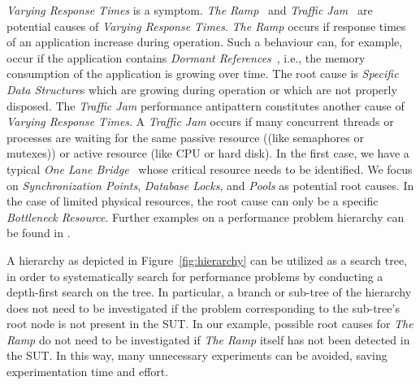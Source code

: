\documentclass{report}
\begin{document}
\emph{Varying Response Times} is a symptom. \emph{The Ramp}~\cite{smith2003new} and \emph{Traffic
Jam}~\cite{smith2002software} are potential causes of \emph{Varying Response
Times}.
\emph{The Ramp} occurs if response times of an application increase during
operation. Such a behaviour can, for example, occur if the
application contains \emph{Dormant References}~\cite{rayside2007object}, i.e.,
the memory consumption of the application is growing over time. The root cause
is \emph{Specific Data Structure}s which are growing during operation or which are not properly
disposed.
The \emph{Traffic Jam} performance antipattern constitutes another cause of \emph{Varying Response Times}. 
A \emph{Traffic Jam} occurs if many concurrent threads or processes are waiting for the same passive resource ((like
semaphores or mutexes)) or active resource (like
CPU or hard disk). In the first case, we have a typical \emph{One Lane Bridge}~\cite{smith2000software}
whose critical resource needs to be identified. We focus on \emph{Synchronization Points}, \emph{Database Locks}, and \emph{Pools} as potential root causes.
In the case of limited physical resources, the root cause can only be a specific \emph{Bottleneck Resource}.
Further examples on a performance problem hierarchy can be found in \cite{wert2013supporting, wert2014automatic,
wert2013performance}. 

A hierarchy as depicted in Figure~\ref{fig:hierarchy} can be utilized as a search
tree, in order to systematically search for performance problems by conducting a depth-first search on the tree. In
particular, a branch or sub-tree of the hierarchy does not need to be investigated if the problem corresponding to the
sub-tree's root node is not present in the SUT. In our example, possible root causes for \emph{The Ramp} do not need to
be investigated if \emph{The Ramp} itself has not been detected in the SUT. In this way, many unnecessary experiments
can be avoided, saving experimentation time and effort. 
\end{document}
